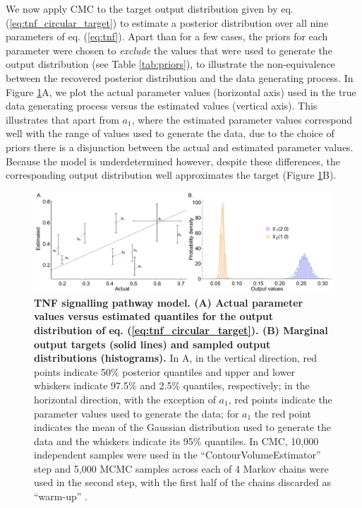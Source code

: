 We now apply CMC to the target output distribution given by eq. (\ref{eq:tnf_circular_target}) to estimate a posterior distribution over all nine parameters of eq. (\ref{eq:tnf}). Apart than for a few cases, the priors for each parameter were chosen to \emph{exclude} the values that were used to generate the output distribution (see Table \ref{tab:priors}), to illustrate the non-equivalence between the recovered posterior distribution and the data generating process. In Figure \ref{fig:tnf_circular_versus}A, we plot the actual parameter values (horizontal axis) used in the true data generating process versus the estimated values (vertical axis). This illustrates that apart from $a_1$, where the estimated parameter values correspond well with the range of values used to generate the data, due to the choice of priors there is a disjunction between the actual and estimated parameter values. Because the model is underdetermined however, despite these differences, the corresponding output distribution well approximates the target (Figure \ref{fig:tnf_circular_versus}B).


\begin{figure}[H]
\centerline{\includegraphics[width=1.5\textwidth]{../figures/tnf_circular_both.pdf}}
\caption{\textbf{TNF signalling pathway model. (A) Actual parameter values versus estimated quantiles for the output distribution of eq. (\ref{eq:tnf_circular_target}). (B) Marginal output targets (solid lines) and sampled output distributions (histograms).} In A, in the vertical direction, red points indicate 50\% posterior quantiles and upper and lower whiskers indicate 97.5\% and 2.5\% quantiles, respectively; in the horizontal direction, with the exception of $a_1$, red points indicate the parameter values used to generate the data; for $a_1$ the red point indicates the mean of the Gaussian distribution used to generate the data and the whiskers indicate its 95\% quantiles. In CMC, 10,000 independent samples were used in the ``ContourVolumeEstimator'' step and 5,000 MCMC samples across each of 4 Markov chains were used in the second step, with the first half of the chains discarded as ``warm-up'' \cite{lambert2018Student}.}
	\label{fig:tnf_circular_versus}
\end{figure}

